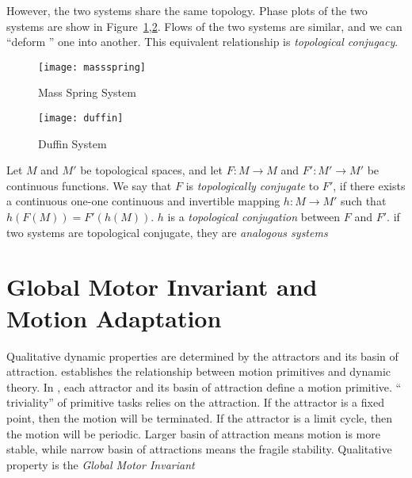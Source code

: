 However, the two systems share the same topology. 
Phase plots of the two systems are show in Figure~\ref{fig:msphaseplot},\ref{fig:duffin}.
Flows of the two systems are similar, and we can ``deform '' one into another.
This equivalent relationship is  \emph{topological conjugacy}.

\begin{figure}
\begin{center}
\texttt{[image: massspring]}
\end{center}
\caption{Mass Spring System}
\label{fig:msphaseplot}
\end{figure}

\begin{figure}
\begin{center}
\texttt{[image: duffin]}
\end{center}
\caption{Duffin System}
\label{fig:duffin}
\end{figure}



\begin{mydef}
Let $M$ and $M'$ be topological spaces, and let $F\colon M\to M$ and $F'\colon M'\to M'$
be continuous functions. We say that $F$ is
\emph{topologically conjugate} to $F'$, if there exists a continuous
one-one continuous and invertible mapping $h \colon M\to M'$ such that $h(F(M))=F'(h(M))$.
$h$ is a \emph{topological conjugation} between $F$ and $F'$.
if two systems are topological conjugate, they are \emph{analogous systems}
\end{mydef}




\section{Global Motor Invariant and Motion Adaptation}
\label{sec:GMIandMA}
Qualitative  dynamic properties are determined by the attractors and its basin of attraction.
\moit establishes the relationship between motion primitives and dynamic theory.
In \moit, each attractor and its basin of attraction define a motion primitive.
 `` triviality'' of primitive tasks relies on the attraction.
If the attractor is a fixed point, then the motion will be terminated.
If the attractor is a limit cycle, then the motion will be periodic.
Larger basin of attraction means motion is more stable, while narrow basin of attractions means the fragile stability.
Qualitative property is the \emph{Global Motor Invariant}

